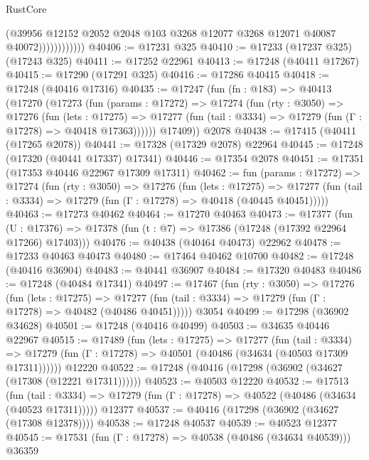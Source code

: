 \begin{lexlean}{RustCore}
\begin{coremodule}
                          (@39956
                            @12152
                            @2052
                            @2048
                            @103
                            @3268
                            @12077
                            @3268
                            @12071
                            @40087
                            @40072))))))))))))
@40406 := @17231 @325
@40410 := @17233 (@17237 @325) (@17243 @325)
@40411 := @17252 @22961
@40413 := @17248 (@40411 @17267)
@40415 := @17290 (@17291 @325)
@40416 := @17286 @40415
@40418 := @17248 (@40416 @17316)
@40435 := @17247
    (fun (fn : @183) =>
    @40413
      (@17270
        (@17273
          (fun (params : @17272) =>
          @17274
            (fun (rty : @3050) =>
            @17276
              (fun (lets : @17275) =>
              @17277 (fun (tail : @3334) => @17279 (fun (Γ : @17278) => @40418 @17363))))))
        @17409))
    @2078
@40438 := @17415 (@40411 (@17265 @2078))
@40441 := @17328 (@17329 @2078) @22964
@40445 := @17248 (@17320 (@40441 @17337) @17341)
@40446 := @17354 @2078
@40451 := @17351 (@17353 @40446 @22967 @17309 @17311)
@40462 := fun (params : @17272) =>
  @17274
    (fun (rty : @3050) =>
    @17276
      (fun (lets : @17275) =>
      @17277 (fun (tail : @3334) => @17279 (fun (Γ : @17278) => @40418 (@40445 @40451)))))
@40463 := @17273 @40462
@40464 := @17270 @40463
@40473 := @17377
    (fun (U : @17376) => @17378 (fun (t : @7) => @17386 (@17248 (@17392 @22964 @17266) @17403)))
@40476 := @40438 (@40464 @40473) @22962
@40478 := @17233 @40463 @40473
@40480 := @17464 @40462 @10700
@40482 := @17248 (@40416 @36904)
@40483 := @40441 @36907
@40484 := @17320 @40483
@40486 := @17248 (@40484 @17341)
@40497 := @17467
    (fun (rty : @3050) =>
    @17276
      (fun (lets : @17275) =>
      @17277 (fun (tail : @3334) => @17279 (fun (Γ : @17278) => @40482 (@40486 @40451)))))
    @3054
@40499 := @17298 (@36902 @34628)
@40501 := @17248 (@40416 @40499)
@40503 := @34635 @40446 @22967
@40515 := @17489
    (fun (lets : @17275) =>
    @17277
      (fun (tail : @3334) =>
      @17279 (fun (Γ : @17278) => @40501 (@40486 (@34634 (@40503 @17309 @17311))))))
    @12220
@40522 := @17248 (@40416 (@17298 (@36902 (@34627 (@17308 (@12221 @17311))))))
@40523 := @40503 @12220
@40532 := @17513
    (fun (tail : @3334) => @17279 (fun (Γ : @17278) => @40522 (@40486 (@34634 (@40523 @17311)))))
    @12377
@40537 := @40416 (@17298 (@36902 (@34627 (@17308 @12378))))
@40538 := @17248 @40537
@40539 := @40523 @12377
@40545 := @17531 (fun (Γ : @17278) => @40538 (@40486 (@34634 @40539))) @36359

\end{coremodule}
\end{lexlean}
